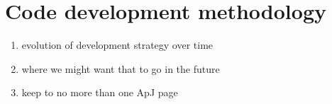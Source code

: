 
\section{Code development methodology}
\begin{enumerate}
\item evolution of development strategy over time
\item where we might want that to go in the future
\item keep to no more than one ApJ page
\end{enumerate}
 